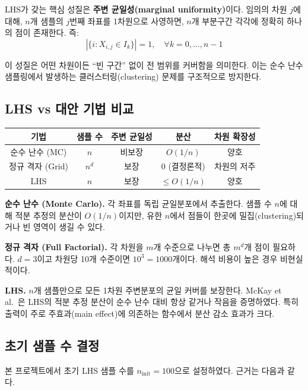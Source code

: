 \documentclass[11pt]{article}
\begin{document}
LHS가 갖는 핵심 성질은 \textbf{주변 균일성(marginal uniformity)}이다.
임의의 차원 $j$에 대해, $n$개 샘플의 $j$번째 좌표를 1차원으로 사영하면,
$n$개 부분구간 각각에 정확히 하나의 점이 존재한다. 즉:
\[
|\{i : X_{i,j} \in I_k\}| = 1, \quad \forall k = 0, \dots, n-1
\]

이 성질은 어떤 차원이든 ``빈 구간'' 없이 전 범위를 커버함을 의미한다.
이는 순수 난수 샘플링에서 발생하는 클러스터링(clustering) 문제를 구조적으로 방지한다.

\subsection{LHS vs 대안 기법 비교}

\begin{table}[h]
\centering
\begin{tabular}{ccccc}
\toprule
기법 & 샘플 수 & 주변 균일성 & 분산 & 차원 확장성 \\
\midrule
순수 난수 (MC) & $n$ & 비보장 & $O(1/n)$ & 양호 \\
정규 격자 (Grid) & $n^d$ & 보장 & 0 (결정론적) & 차원의 저주 \\
LHS & $n$ & 보장 & $\leq O(1/n)$ & 양호 \\
\bottomrule
\end{tabular}
\end{table}

\textbf{순수 난수 (Monte Carlo).}
각 좌표를 독립 균일분포에서 추출한다.
샘플 수 $n$에 대해 적분 추정의 분산이 $O(1/n)$이지만,
유한 $n$에서 점들이 한곳에 밀집(clustering)되거나 빈 영역이 생길 수 있다.

\textbf{정규 격자 (Full Factorial).}
각 차원을 $m$개 수준으로 나누면 총 $m^d$개 점이 필요하다.
$d = 3$이고 차원당 10개 수준이면 $10^3 = 1000$개이다.
해석 비용이 높은 경우 비현실적이다.

\textbf{LHS.}
$n$개 샘플만으로 모든 1차원 주변분포의 균일 커버를 보장한다.
McKay et al.~\cite{McKay1979}은 LHS의 적분 추정 분산이 순수 난수 대비 항상 같거나 작음을 증명하였다.
특히 출력이 주로 주효과(main effect)에 의존하는 함수에서 분산 감소 효과가 크다.

\subsection{초기 샘플 수 결정}

본 프로젝트에서 초기 LHS 샘플 수를 $n_{\mathrm{init}} = 100$으로 설정하였다.
근거는 다음과 같다.
\end{document}
